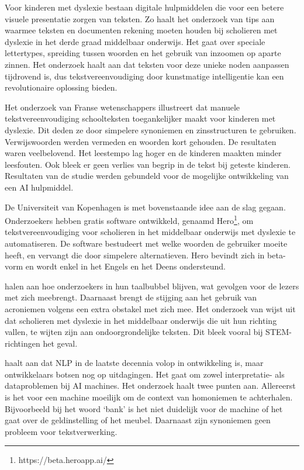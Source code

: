 Voor kinderen met dyslexie bestaan digitale hulpmiddelen die voor een betere visuele presentatie zorgen van teksten. Zo haalt het onderzoek van \textcite{Rello2012} tips aan waarmee teksten en documenten rekening moeten houden bij scholieren met dyslexie in het derde graad middelbaar onderwijs. Het gaat over speciale lettertypes, spreiding tussen woorden en het gebruik van inzoomen op aparte zinnen. Het onderzoek haalt aan dat teksten voor deze unieke noden aanpassen tijdrovend is, dus tekstvereenvoudiging door kunstmatige intelligentie kan een revolutionaire oplossing bieden. 

Het onderzoek van Franse wetenschappers \newline \textcite{Gala2016} illustreert dat manuele tekstvereenvoudiging schoolteksten toegankelijker \newline maakt voor kinderen met dyslexie. Dit deden ze door simpelere synoniemen en zinsstructuren te gebruiken. Verwijswoorden werden vermeden en woorden kort gehouden. De resultaten waren veelbelovend. Het leestempo lag hoger en de kinderen maakten minder leesfouten. Ook bleek er geen verlies van begrip in de tekst bij geteste kinderen. Resultaten van de studie werden gebundeld voor de mogelijke ontwikkeling van een AI hulpmiddel.

De Universiteit van Kopenhagen is met bovenstaande idee aan de slag gegaan. Onderzoekers \textcite{Bingel2018} hebben gratis software ontwikkeld, genaamd Hero\footnote{https://beta.heroapp.ai/}, om tekstvereenvoudiging voor scholieren in het middelbaar onderwijs met dyslexie te automatiseren. De software bestudeert met welke woorden de gebruiker moeite heeft, en vervangt die door simpelere alternatieven. Hero bevindt zich in beta-vorm en wordt enkel in het Engels en het Deens ondersteund. 

\textcite{PlavenSigray2017} halen aan hoe onderzoekers in hun taalbubbel blijven, wat gevolgen voor de lezers met zich meebrengt. Daarnaast brengt de stijging aan het gebruik van acroniemen volgens \textcite{Barnett2020} een extra obstakel met zich mee. Het onderzoek van \textcite{Donato2022} wijst uit dat scholieren met dyslexie in het middelbaar onderwijs die uit hun richting vallen, te wijten zijn aan ondoorgrondelijke teksten. Dit bleek vooral bij STEM-richtingen het geval. 

\textcite{Roldos2020} haalt aan dat NLP in de laatste decennia volop in ontwikkeling is, maar ontwikkelaars botsen nog op uitdagingen. Het gaat om zowel interpretatie- als dataproblemen bij AI machines. Het onderzoek haalt twee punten aan. Allereerst is het voor een machine moeilijk om de context van homoniemen te achterhalen. Bijvoorbeeld bij het woord ‘bank’ is het niet duidelijk voor de machine of het gaat over de geldinstelling of het meubel. Daarnaast zijn synoniemen geen probleem voor tekstverwerking.

